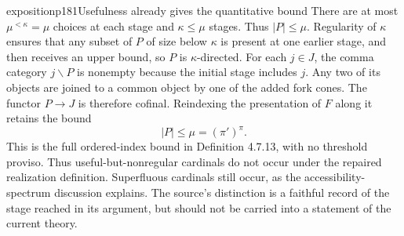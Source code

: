\begin{dcomment}{exposition}{p181}{Usefulness already gives the quantitative bound}
There are at most $\mu^{<\kappa}=\mu$ choices at each stage and $\kappa\leq\mu$ stages. Thus $|P|\leq\mu$. Regularity of $\kappa$ ensures that any subset of $P$ of size below $\kappa$ is present at one earlier stage, and then receives an upper bound, so $P$ is $\kappa$-directed. For each $j\in J$, the comma category $j\backslash P$ is nonempty because the initial stage includes $j$. Any two of its objects are joined to a common object by one of the added fork cones. The functor $P\to J$ is therefore cofinal. Reindexing the presentation of $F$ along it retains the bound
\[
 |P|\leq\mu=(\pi')^\pi.
\]
This is the full ordered-index bound in Definition 4.7.13, with no threshold proviso. Thus useful-but-nonregular cardinals do not occur under the repaired realization definition. Superfluous cardinals still occur, as the accessibility-spectrum discussion explains. The source's distinction is a faithful record of the stage reached in its argument, but should not be carried into a statement of the current theory.
\end{dcomment}

